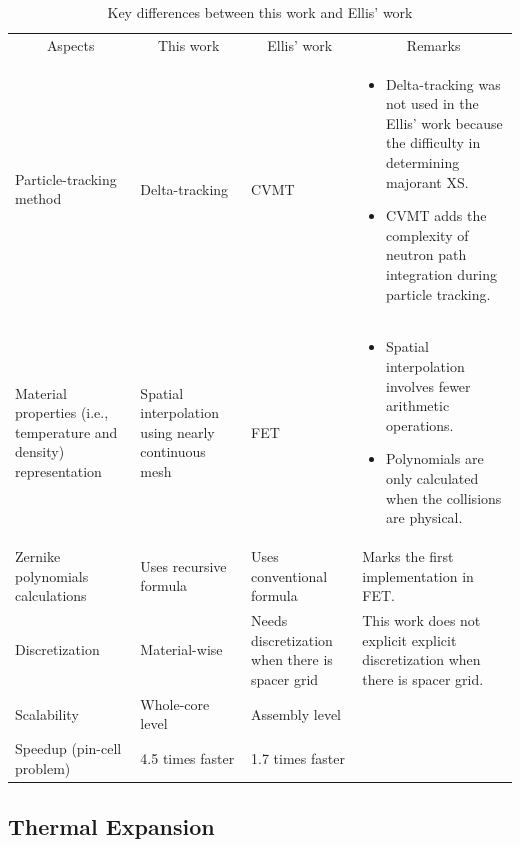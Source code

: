 \begin{table}
    \centering
    \setlength{\leftmargini}{0.2cm}
    \caption{Key differences between this work and Ellis' work}
    \label{tab_1q} 
    \begin{tabular}{| m{2.75cm} | m{2.75cm} | m{2.75cm} | m{6cm} | }
        \hline
        \multicolumn{1}{|c|}{Aspects} & \multicolumn{1}{c|}{This work} & \multicolumn{1}{c|}{Ellis' work} & \multicolumn{1}{c|}{Remarks} \\
        \hhline{|=|=|=|=|}
        Particle-tracking method & Delta-tracking & CVMT & 
        \begin{itemize} 
            \item Delta-tracking was not used in the Ellis' work because the difficulty in determining majorant XS.
            \item CVMT adds the complexity of neutron path integration during particle tracking.
        \end{itemize} \\
        \hline
        Material properties (i.e., temperature and density) representation & Spatial interpolation using nearly continuous mesh & FET & 
        \begin{itemize} 
            \item Spatial interpolation involves fewer arithmetic operations.
            \item Polynomials are only calculated when the collisions are physical.
        \end{itemize} \\
        \hline
        Zernike polynomials calculations & Uses recursive formula & Uses conventional formula & Marks the first implementation in FET. \\ \hline
        Discretization & Material-wise & Needs discretization when there is spacer grid & This work does not explicit explicit discretization when there is spacer grid. \\ \hline
        Scalability & Whole-core level & Assembly level &  \\ \hline
        Speedup (pin-cell problem) & 4.5 times faster & 1.7 times faster &  \\ \hline
    \end{tabular}
\end{table}

\subsection{Thermal Expansion} \label{sec12}

